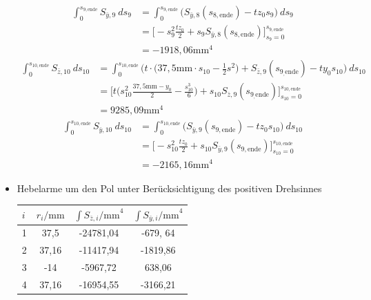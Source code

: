 \begin{itemize}
\begin{equation}
	\end{equation}
	\begin{equation}
		\begin{split}
			\int_{0}^{s_{9,\mathrm{ende}}} S_{\bar y,9}\ ds_9 &= \int_{0}^{s_{9,\mathrm{ende}}} \bigg(S_{\bar y,8}(s_{8,\mathrm{ende}})-tz_0s_9\bigg)\ ds_9\\\
			&=\bigg[-s_9^2\frac{tz_0}{2}+s_9S_{\bar y,8}(s_{8,\mathrm{ende}})\bigg]_{s_9=0}^{s_{9,\mathrm{ende}}}\\\
			&=-1918,06\mathrm{mm}^4
		\end{split}
	\end{equation}
	\begin{equation}
		\begin{split}
			\int_{0}^{s_{10,\mathrm{ende}}} S_{\bar z,10}\ ds_{10} &= \int_{0}^{s_{10,\mathrm{ende}}} \bigg(t\cdot\bigg(37,5\mathrm{mm}\cdot s_{10} - \frac{1}{2}s^2\bigg) + S_{\bar z,9}(s_{9_,\mathrm{ende}})-ty_0s_{10}\bigg)\ ds_{10}\\\
			&=\bigg[t\bigg(s_{10}^2\frac{37,5\mathrm{mm}-y_0}{2}-\frac{s_{10}^3}{6}\bigg)+s_{10}S_{\bar z,9}(s_{9_,\mathrm{ende}})\bigg]_{s_{10}=0}^{s_{10,\mathrm{ende}}}\\\
			&=9285,09\mathrm{mm}^4
		\end{split}
	\end{equation}
	\begin{equation}
		\begin{split}
			\int_{0}^{s_{10,\mathrm{ende}}} S_{\bar y,10}\ ds_{10} &= \int_{0}^{s_{10,\mathrm{ende}}}\bigg(S_{\bar y,9}(s_{9,\mathrm{ende}})-tz_0s_{10}\bigg)\ ds_{10}\\\
			&=\bigg[-s_{10}^2\frac{tz_0}{2}+s_{10}S_{\bar y,9}(s_{9,\mathrm{ende}})\bigg]_{s_{10}=0}^{s_{10,\mathrm{ende}}}\\\
			&=-2165,16\mathrm{mm}^4
		\end{split}
	\end{equation}
\item Hebelarme um den Pol unter Berücksichtigung des positiven Drehsinnes
\begin{center}
\begin{tabular}[h]{l|c|c|c}
	$i$&$r_i\mathrm{/mm}$&$\int S_{\bar z,i}\mathrm{/mm}^4$&$\int S_{\bar y,i}\mathrm{/mm}^4$\\
	\hline
	1&37,5&-24781,04&-679, 64\\
	2&37,16&-11417,94&-1819,86\\
	3&-14&-5967,72&638,06\\
	4&37,16&-16954,55&-3166,21\\

\end{tabular}
\end{center}
\end{itemize}
